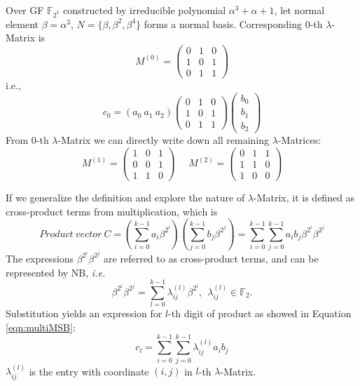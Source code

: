 \begin{Example}
Over GF $\mathbb F_{2^3}$ constructed by irreducible polynomial $\alpha^3 + \alpha + 1$, let normal element $\beta = \alpha^3$, $N = \{ \beta, \beta^2, \beta^4\}$ 
forms a normal basis. Corresponding $0$-th $\lambda$-Matrix is
\begin{equation*}
M^{(0)} = \left(
\begin{array} {lcr}
0 & 1 & 0\\
1 & 0 & 1\\
0 & 1 & 1
\end{array} \right)
\end{equation*}
i.e.,
\begin{equation*}
c_0 = (a_0\  a_1\  a_2)\left(
\begin{array} {lcr}
0 & 1 & 0\\
1 & 0 & 1\\
0 & 1 & 1
\end{array} \right)\left(
\begin{array} {lcr}
b_0\\
b_1\\
b_2
\end{array} \right)
\end{equation*}
From $0$-th $\lambda$-Matrix we can directly write down all remaining $\lambda$-Matrices:
\begin{equation*}
M^{(1)} = \left(
\begin{array} {lcr}
1 & 0 & 1\\
0 & 0 & 1\\
1 & 1 & 0
\end{array} \right)~~~~~~
M^{(2)} = \left(
\begin{array} {lcr}
0 & 1 & 1\\
1 & 1 & 0\\
1 & 0 & 0
\end{array} \right)
\end{equation*}
\end{Example}

If we generalize the definition and explore the nature of $\lambda$-Matrix, it is defined as cross-product terms from multiplication, which is 
\begin{equation}
Product~vector~C = (\sum_{i=0}^{k-1}a_i\beta^{2^i})(\sum_{j=0}^{k-1}b_j\beta^{2^j}) = \sum_{i=0}^{k-1}\sum_{j=0}^{k-1}a_ib_j\beta^{2^i}\beta^{2^j}
\end{equation}
The expressions $\beta^{2^i}\beta^{2^j}$ are referred to as cross-product terms, and can be represented by
NB, {\it i.e.}
\begin{equation}
\beta^{2^i}\beta^{2^j} = \sum_{l=0}^{k-1}\lambda_{ij}^{(l)}\beta^{2^l}, \ \ \lambda_{ij}^{(l)} \in \mathbb F_2.
\end{equation}
Substitution yields an expression for $l$-th digit of product as showed in Equation \ref{eqn:multiMSB}:
\begin{equation}
c_l = \sum_{i=0}^{k-1}\sum_{j=0}^{k-1}\lambda_{ij}^{(l)}a_ib_j
\end{equation}
$\lambda_{ij}^{(l)}$ is the entry with coordinate $(i,j)$ in $l$-th $\lambda$-Matrix.

